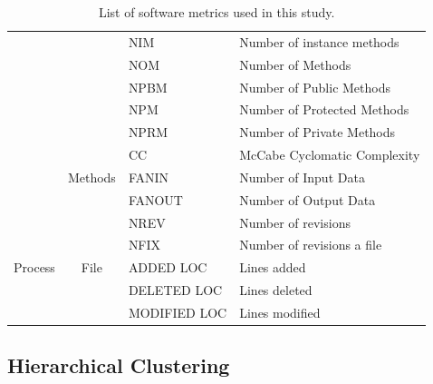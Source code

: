 \documentclass[10pt,journal,compsoc]{IEEEtran}
\begin{document}
\begin{table}[!t]
\begin{tabular}{|p{1cm}|c|l|p{3cm}|}
                                  &                                   & NIM         & Number of instance methods     \\ \cline{3-4} 
                                  &                                   & NOM         & Number of Methods              \\ \cline{3-4} 
                                  &                                   & NPBM        & Number of Public Methods       \\ \cline{3-4} 
                                  &                                   & NPM         & Number of Protected Methods    \\ \cline{3-4} 
                                  &                                   & NPRM        & Number of Private Methods      \\ \cline{2-4} 
                                  & \multirow{3}{*}{Methods}          & CC          & McCabe Cyclomatic Complexity   \\ \cline{3-4} 
                                  &                                   & FANIN       & Number of Input Data           \\ \cline{3-4} 
                                  &                                   & FANOUT      & Number of Output Data          \\ \hline
\multirow{5}{*}{Process }  & \multirow{5}{*}{File}             & NREV        & Number of revisions            \\ \cline{3-4} 
                                  &                                   & NFIX        & Number of revisions a file     \\ \cline{3-4} 
                                  &                                   & ADDED LOC    & Lines added                    \\ \cline{3-4} 
                                  &                                   & DELETED LOC  & Lines deleted                  \\ \cline{3-4} 
                                  &                                   & MODIFIED LOC & Lines modified                 \\ \hline
\end{tabular}
\caption{List of software metrics used in this study.}
\label{tbl:metric}
\end{table}
\subsection{Hierarchical Clustering}\label{sec:hc}
\end{document}
